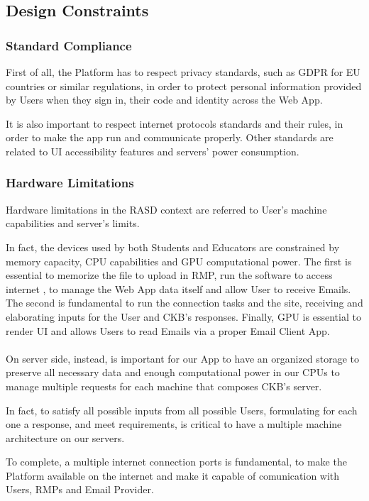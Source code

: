 \subsection{Design Constraints}

\subsubsection{Standard Compliance}
First of all, the Platform has to respect privacy standards, such as GDPR for EU countries or similar regulations, in order to protect personal information provided by Users when they sign in, their code and identity across the Web App.

It is also important to respect internet protocols standards and their rules, in order to make the app run and communicate properly. Other standards are related to UI accessibility features and servers' power consumption. 

\subsubsection{Hardware Limitations}
Hardware limitations in the RASD context are referred to User's machine capabilities and server's limits. 

In fact, the devices used by both Students and Educators are constrained by memory capacity, CPU capabilities and GPU computational power. The first is essential to memorize the file to upload in RMP, run the software to access internet
, to manage the Web App data itself and allow User to receive Emails. The second is fundamental to run the connection tasks and the site, receiving and elaborating inputs for the User and CKB's responses. Finally, GPU is essential to render UI and allows Users to read Emails via a proper Email Client App.\\
\\
 On server side, instead, is important for our App to have an organized storage to preserve all necessary data and enough computational power in our CPUs to manage multiple requests for each machine that composes CKB's server. 
 
In fact, to satisfy all possible inputs from all possible Users, formulating for each one a response, and meet requirements, is critical to have a multiple machine architecture on our servers. 

To complete, a multiple internet connection ports is fundamental, to make the Platform available on the internet and make it capable of comunication with Users, RMPs and Email Provider.

